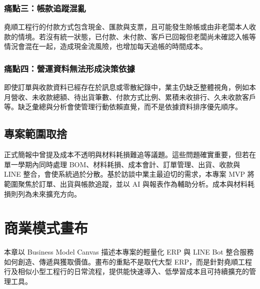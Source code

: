 \documentclass[12pt,a4paper,UTF8,fontset=none]{ctexart}
\begin{document}
\subsubsection{痛點三：帳款追蹤混亂}

堯順工程行的付款方式包含現金、匯款與支票，且可能發生賒帳或由非老闆本人收款的情境。若沒有統一狀態，已付款、未付款、客戶已回報但老闆尚未確認入帳等情況會混在一起，造成現金流風險，也增加每天追帳的時間成本。

\subsubsection{痛點四：營運資料無法形成決策依據}

即使訂單與收款資料已經存在於訊息或零散紀錄中，業主仍缺乏整體視角，例如本月營收、未收款總額、待出貨筆數、付款方式比例、累積未收排行、久未收款客戶等。缺乏彙總與分析會使管理行動依賴直覺，而不是依據資料排序優先順序。

\subsection{專案範圍取捨}

正式簡報中曾提及成本不透明與材料耗損難追等議題。這些問題確實重要，但若在單一學期內同時處理 BOM、材料耗損、成本會計、訂單管理、出貨、收款與 LINE 整合，會使系統過於分散。基於訪談中業主最迫切的需求，本專案 MVP 將範圍聚焦於訂單、出貨與帳款追蹤，並以 AI 與報表作為輔助分析。成本與材料耗損則列為未來擴充方向。

\section{商業模式畫布}

本章以 Business Model Canvas 描述本專案的輕量化 ERP 與 LINE Bot 整合服務如何創造、傳遞與獲取價值。畫布的重點不是取代大型 ERP，而是針對堯順工程行及相似小型工程行的日常流程，提供能快速導入、低學習成本且可持續擴充的管理工具。
\end{document}
